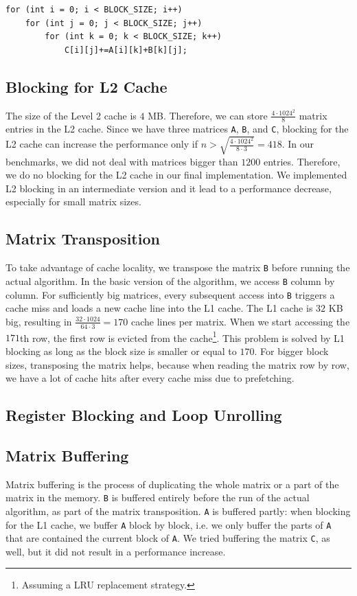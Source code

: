 \documentclass[12pt]{article}
\begin{document}
\begin{lstlisting}
for (int i = 0; i < BLOCK_SIZE; i++)
	for (int j = 0; j < BLOCK_SIZE; j++)
		for (int k = 0; k < BLOCK_SIZE; k++)
			C[i][j]+=A[i][k]+B[k][j];
\end{lstlisting}


\subsection{Blocking for L2 Cache}
The size of the Level 2 cache is $4$ MB. Therefore, we can store $\frac{4 \cdot 1024^2}{8}$ matrix entries in the L2 cache. Since we have three matrices \lstinline{A}, \lstinline{B}, and \lstinline{C}, blocking for the L2 cache can increase the performance only if $n > \sqrt{\frac{4 \cdot 1024^2}{8 \cdot 3}} = 418$. In our benchmarks, we did not deal with matrices bigger than $1200$ entries. Therefore, we do no blocking for the L2 cache in our final implementation. We implemented L2 blocking in an intermediate version and it lead to a performance decrease, especially for small matrix sizes.

\subsection{Matrix Transposition}
To take advantage of cache locality, we transpose the matrix \lstinline{B} before running the actual algorithm. In the basic version of the algorithm, we access \lstinline{B} column by column. For sufficiently big matrices, every subsequent access into \lstinline{B} triggers a cache miss and loads a new cache line into the L1 cache. The L1 cache is $32$ KB big, resulting in $\frac{32 \cdot 1024}{64 \cdot 3} = 170$ cache lines per matrix. When we start accessing the $171$th row, the first row is evicted from the cache\footnote{Assuming a LRU replacement strategy.}. This problem is solved by L1 blocking as long as the block size is smaller or equal to $170$. For bigger block sizes, transposing the matrix helps, because when reading the matrix row by row, we have a lot of cache hits after every cache miss due to prefetching. 

\subsection{Register Blocking and Loop Unrolling}

\subsection{Matrix Buffering}
Matrix buffering is the process of duplicating the whole matrix or a part of the matrix in the memory. \lstinline{B} is buffered entirely before the run of the actual algorithm, as part of the matrix transposition. \lstinline{A} is buffered partly: when blocking for the L1 cache, we buffer \lstinline{A} block by block, i.e. we only buffer the parts of \lstinline{A} that are contained the current block of \lstinline{A}. We tried buffering the matrix \lstinline{C}, as well, but it did not result in a performance increase. 
\end{document}
